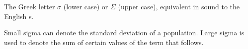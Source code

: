 The Greek letter $ \sigma $ (lower case) or $ \Sigma $ (upper case),
equivalent in sound to the English s.
\par
Small sigma can denote the standard deviation of a population.
Large sigma is used to denote the sum of certain values of the
term that follows.
